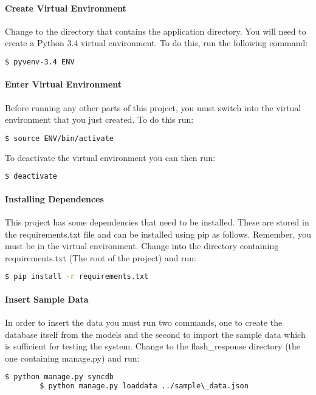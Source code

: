 \documentclass[10pt]{report}
\begin{document}
    \paragraph{Create Virtual Environment}
    Change to the directory that contains the application directory.  You will need to create a Python 3.4
    virtual environment.  To do this, run the following command:
    \begin{lstlisting}[language=bash]
    	$ pyvenv-3.4 ENV
    \end{lstlisting}
    
    \paragraph{Enter Virtual Environment}
    Before running any other parts of this project, you must switch into the virtual environment that you
    just created.  To do this run:
    \begin{lstlisting}[language=bash]
    	$ source ENV/bin/activate
    \end{lstlisting}
    To deactivate the virtual environment you can then run:
    \begin{lstlisting}[language=bash]
    	$ deactivate
    \end{lstlisting}
    
    \paragraph{Installing Dependences}
    This project has some dependencies that need to be installed.  These are stored in the 
    requirements.txt file and can be installed using pip as follows.  Remember, you must be in the virtual
    environment.  Change into the directory containing requirements.txt (The root of the project) and run:
    \begin{lstlisting}[language=bash]
    	$ pip install -r requirements.txt
    \end{lstlisting}
    
    \paragraph{Insert Sample Data}
    In order to insert the data you must run two commands, one to create the database itself from the
    models and the second to import the sample data which is sufficient for testing the system. Change to
    the flash\_response directory (the one containing manage.py) and run:
    \begin{lstlisting}[language=bash]
    	$ python manage.py syncdb
    	$ python manage.py loaddata ../sample\_data.json
    \end{lstlisting}
\end{document}
